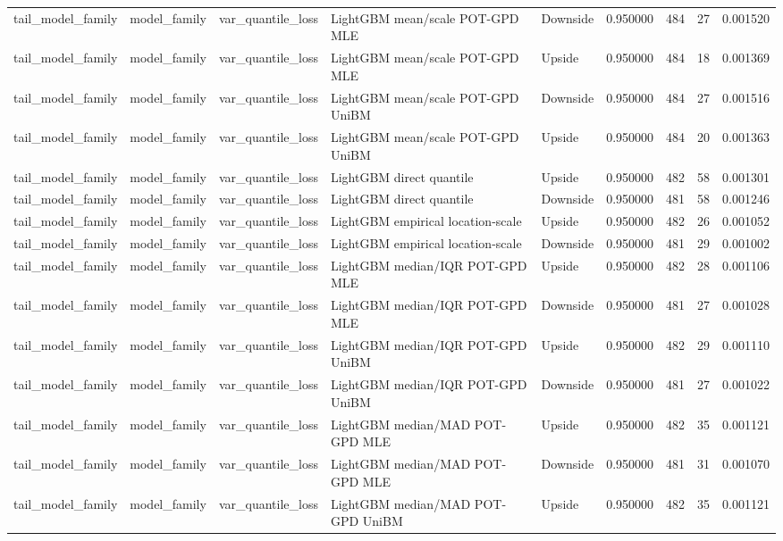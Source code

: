 \begin{tabular}{lllllrrr}
tail\_model\_family & model\_family & var\_quantile\_loss & LightGBM mean/scale POT-GPD MLE & Downside & 0.950000 & 484 & 27 & 0.001520 \\
tail\_model\_family & model\_family & var\_quantile\_loss & LightGBM mean/scale POT-GPD MLE & Upside & 0.950000 & 484 & 18 & 0.001369 \\
tail\_model\_family & model\_family & var\_quantile\_loss & LightGBM mean/scale POT-GPD UniBM & Downside & 0.950000 & 484 & 27 & 0.001516 \\
tail\_model\_family & model\_family & var\_quantile\_loss & LightGBM mean/scale POT-GPD UniBM & Upside & 0.950000 & 484 & 20 & 0.001363 \\
tail\_model\_family & model\_family & var\_quantile\_loss & LightGBM direct quantile & Upside & 0.950000 & 482 & 58 & 0.001301 \\
tail\_model\_family & model\_family & var\_quantile\_loss & LightGBM direct quantile & Downside & 0.950000 & 481 & 58 & 0.001246 \\
tail\_model\_family & model\_family & var\_quantile\_loss & LightGBM empirical location-scale & Upside & 0.950000 & 482 & 26 & 0.001052 \\
tail\_model\_family & model\_family & var\_quantile\_loss & LightGBM empirical location-scale & Downside & 0.950000 & 481 & 29 & 0.001002 \\
tail\_model\_family & model\_family & var\_quantile\_loss & LightGBM median/IQR POT-GPD MLE & Upside & 0.950000 & 482 & 28 & 0.001106 \\
tail\_model\_family & model\_family & var\_quantile\_loss & LightGBM median/IQR POT-GPD MLE & Downside & 0.950000 & 481 & 27 & 0.001028 \\
tail\_model\_family & model\_family & var\_quantile\_loss & LightGBM median/IQR POT-GPD UniBM & Upside & 0.950000 & 482 & 29 & 0.001110 \\
tail\_model\_family & model\_family & var\_quantile\_loss & LightGBM median/IQR POT-GPD UniBM & Downside & 0.950000 & 481 & 27 & 0.001022 \\
tail\_model\_family & model\_family & var\_quantile\_loss & LightGBM median/MAD POT-GPD MLE & Upside & 0.950000 & 482 & 35 & 0.001121 \\
tail\_model\_family & model\_family & var\_quantile\_loss & LightGBM median/MAD POT-GPD MLE & Downside & 0.950000 & 481 & 31 & 0.001070 \\
tail\_model\_family & model\_family & var\_quantile\_loss & LightGBM median/MAD POT-GPD UniBM & Upside & 0.950000 & 482 & 35 & 0.001121 \\

\end{tabular}
